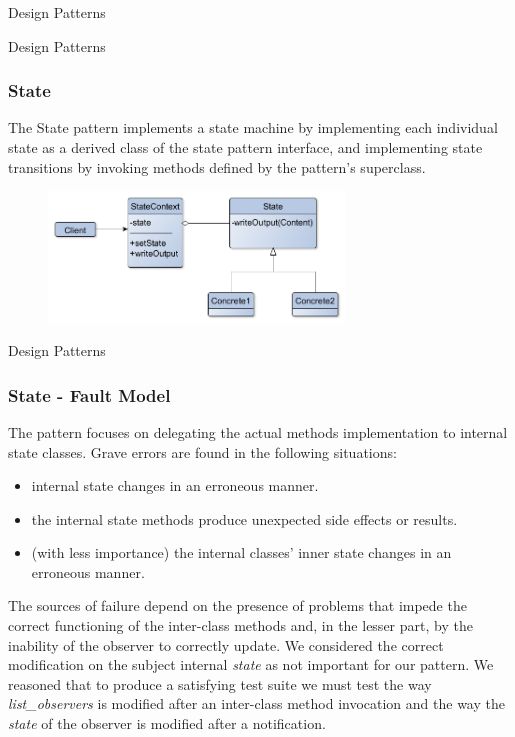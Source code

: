 \documentclass{beamer}
\begin{document}
\begin{section}{Design Patterns}
\begin{subsection}{Design Patterns}
	\begin{frame}
		\frametitle{State}
		The State pattern implements a state machine by implementing each individual state as a derived class of the state pattern interface, and implementing state transitions by invoking methods defined by the pattern's superclass.
\begin{figure}[!h]
	\centering
	\includegraphics[width=0.7\textwidth]{./State/ClassDiagram.png}
	\label{SclassDiag}
\end{figure}
		
	\end{frame}
\end{subsection}

\begin{subsection}{Design Patterns}
	\begin{frame}
		\frametitle{State - Fault Model}
		The pattern focuses on delegating the actual methods implementation to internal state classes. Grave errors are found in the following situations:  
		\begin{itemize}
			\item internal state changes in an erroneous manner. 
			\item the internal state methods produce unexpected side effects or results.
			\item (with less importance) the internal classes' inner state changes in an erroneous manner.
		\end{itemize}
		\vspace{5mm}
		The sources of failure depend on the presence of problems that impede the correct functioning of the inter-class methods and, in the lesser part, by the inability of the observer to correctly update. We considered the correct modification on the subject internal \textit{state} as not important for our pattern.  We reasoned that to produce a satisfying test suite we must test the way \textit{list\_observers} is modified after an inter-class method invocation and the way the \textit{state} of the observer is modified after a notification.
		

\end{frame}
\end{subsection}
\end{section}
\end{document}
